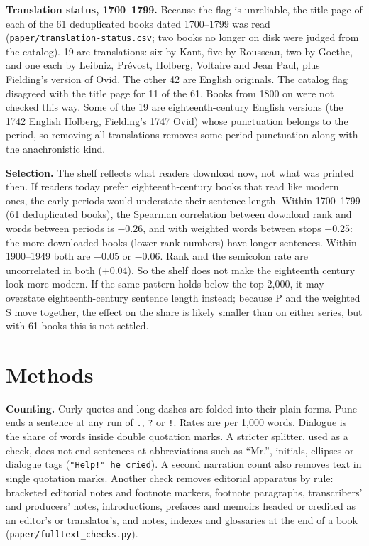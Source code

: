 \documentclass[
  11pt,
]{article}
\begin{document}
\textbf{Translation status, 1700--1799.} Because the flag is unreliable, the title page of each of the 61 deduplicated books dated 1700--1799 was read (\texttt{paper/translation-status.csv}; two books
no longer on disk were judged from the catalog). 19 are translations: six by Kant, five by Rousseau, two by Goethe, and one each by Leibniz, Prévost, Holberg, Voltaire and Jean Paul, plus Fielding's
version of Ovid. The other 42 are English originals. The catalog flag disagreed with the title page for 11 of the 61. Books from 1800 on were not checked this way. Some of the 19 are
eighteenth-century English versions (the 1742 English Holberg, Fielding's 1747 Ovid) whose punctuation belongs to the period, so removing all translations removes some period punctuation along with
the anachronistic kind.

\textbf{Selection.} The shelf reflects what readers download now, not what was printed then. If readers today prefer eighteenth-century books that read like modern ones, the early periods would
understate their sentence length. Within 1700--1799 (61 deduplicated books), the Spearman correlation between download rank and words between periods is −0.26, and with weighted words between stops
−0.25: the more-downloaded books (lower rank numbers) have longer sentences. Within 1900--1949 both are −0.05 or −0.06. Rank and the semicolon rate are uncorrelated in both (+0.04). So the shelf does
not make the eighteenth century look more modern. If the same pattern holds below the top 2,000, it may overstate eighteenth-century sentence length instead; because P and the weighted S move
together, the effect on the share is likely smaller than on either series, but with 61 books this is not settled.

\section{Methods}\label{methods}

\textbf{Counting.} Curly quotes and long dashes are folded into their plain forms. Punc ends a sentence at any run of \texttt{.}, \texttt{?} or \texttt{!}. Rates are per 1,000 words. Dialogue is the
share of words inside double quotation marks. A stricter splitter, used as a check, does not end sentences at abbreviations such as ``Mr.'', initials, ellipses or dialogue tags
(\texttt{"Help!"\ he\ cried}). A second narration count also removes text in single quotation marks. Another check removes editorial apparatus by rule: bracketed editorial notes and footnote markers,
footnote paragraphs, transcribers' and producers' notes, introductions, prefaces and memoirs headed or credited as an editor's or translator's, and notes, indexes and glossaries at the end of a book
(\texttt{paper/fulltext\_checks.py}).
\end{document}
